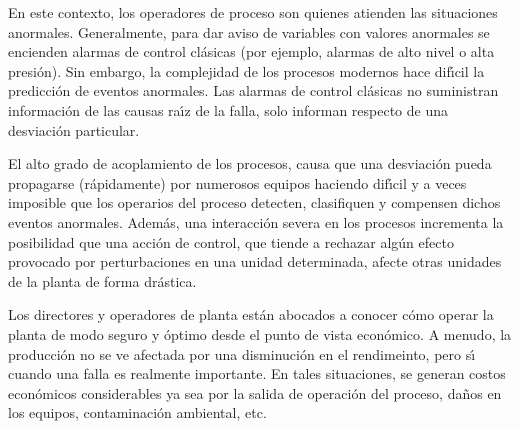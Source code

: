 En este contexto, los operadores de proceso son quienes atienden las situaciones anormales. Generalmente,
para dar aviso de variables con valores anormales se encienden alarmas de control cl{\'a}sicas (por ejemplo,
alarmas de alto nivel o alta presi{\'o}n). Sin embargo, la complejidad de los procesos modernos hace dif{\'\i}cil la
predicci{\'o}n de eventos anormales. Las alarmas de control cl{\'a}sicas no suministran informaci{\'o}n de las causas
ra{\'\i}z de la falla, solo informan respecto de una desviaci{\'o}n particular.

El alto grado de acoplamiento de los procesos, causa que una desviaci{\'o}n pueda propagarse (r{\'a}pidamente) por
numerosos equipos haciendo dif{\'\i}cil y a veces imposible que los operarios del proceso detecten, clasifiquen y
compensen dichos eventos anormales. Adem{\'a}s, una interacci{\'o}n severa en los procesos incrementa la posibilidad
que una acci{\'o}n de control, que tiende a rechazar alg{\'u}n efecto provocado por perturbaciones en una unidad
determinada, afecte otras unidades de la planta de forma dr{\'a}stica.

Los directores y operadores de planta est{\'a}n abocados a conocer c{\'o}mo operar la planta de modo seguro y {\'o}ptimo
desde el punto de vista econ{\'o}mico. A menudo, la producci{\'o}n no se ve afectada por una disminuci{\'o}n en el
rendimeinto, pero s{\'\i} cuando una falla es realmente importante. En tales situaciones, se  generan costos
econ{\'o}micos considerables ya sea por la salida de operaci{\'o}n del proceso, da{\~n}os en los equipos, contaminaci{\'o}n
ambiental, etc.

